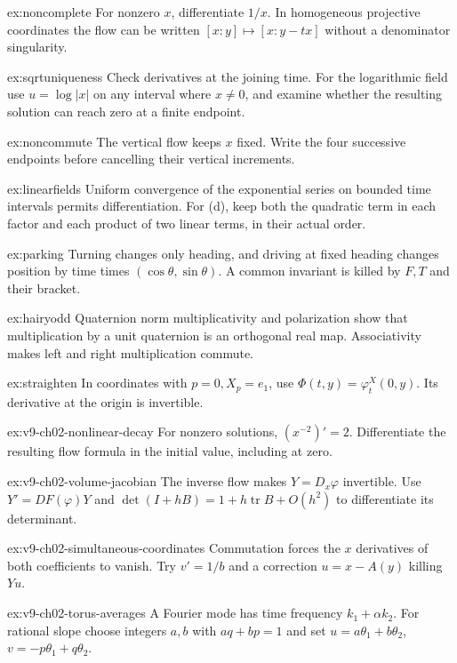 \begin{hint}{ex:noncomplete}
For nonzero $x$, differentiate $1/x$. In homogeneous projective coordinates the flow can be written $[x:y]\mapsto[x:y-tx]$ without a denominator singularity.
\end{hint}
\begin{hint}{ex:sqrtuniqueness}
Check derivatives at the joining time. For the logarithmic field use $u=\log|x|$ on any interval where $x\ne0$, and examine whether the resulting solution can reach zero at a finite endpoint.
\end{hint}
\begin{hint}{ex:noncommute}
The vertical flow keeps $x$ fixed. Write the four successive endpoints before cancelling their vertical increments.
\end{hint}
\begin{hint}{ex:linearfields}
Uniform convergence of the exponential series on bounded time intervals permits differentiation. For (d), keep both the quadratic term in each factor and each product of two linear terms, in their actual order.
\end{hint}
\begin{hint}{ex:parking}
Turning changes only heading, and driving at fixed heading changes position by time times $(\cos\theta,\sin\theta)$. A common invariant is killed by $F,T$ and their bracket.
\end{hint}
\begin{hint}{ex:hairyodd}
Quaternion norm multiplicativity and polarization show that multiplication by a unit quaternion is an orthogonal real map. Associativity makes left and right multiplication commute.
\end{hint}
\begin{hint}{ex:straighten}
In coordinates with $p=0,X_p=e_1$, use $\Phi(t,y)=\varphi_t^X(0,y)$. Its derivative at the origin is invertible.
\end{hint}
\begin{hint}{ex:v9-ch02-nonlinear-decay}
For nonzero solutions, $(x^{-2})'=2$. Differentiate the resulting flow formula in the initial value, including at zero.
\end{hint}
\begin{hint}{ex:v9-ch02-volume-jacobian}
The inverse flow makes $Y=D_x\varphi$ invertible. Use $Y'=DF(\varphi)Y$ and $\det(I+hB)=1+h\operatorname{tr}B+O(h^2)$ to differentiate its determinant.
\end{hint}
\begin{hint}{ex:v9-ch02-simultaneous-coordinates}
Commutation forces the $x$ derivatives of both coefficients to vanish. Try $v'=1/b$ and a correction $u=x-A(y)$ killing $Yu$.
\end{hint}
\begin{hint}{ex:v9-ch02-torus-averages}
A Fourier mode has time frequency $k_1+\alpha k_2$. For rational slope choose integers $a,b$ with $aq+bp=1$ and set $u=a\theta_1+b\theta_2$, $v=-p\theta_1+q\theta_2$.
\end{hint}

